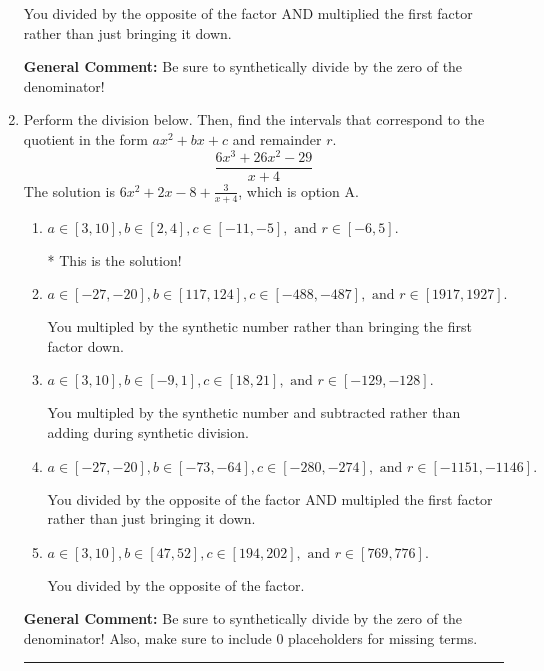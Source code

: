 \documentclass{extbook}[14pt]
\newcommand{\litem}[1]{\item #1

\rule{\textwidth}{0.4pt}}
\begin{document}
\begin{enumerate}
{\begin{enumerate}[label=\Alph*.]
 You divided by the opposite of the factor AND multiplied the first factor rather than just bringing it down.
\end{enumerate}

\textbf{General Comment:} Be sure to synthetically divide by the zero of the denominator!
}
\litem{
Perform the division below. Then, find the intervals that correspond to the quotient in the form $ax^2+bx+c$ and remainder $r$.
\[ \frac{6x^{3} +26 x^{2} -29}{x + 4} \]The solution is \( 6x^{2} +2 x -8 + \frac{3}{x + 4} \), which is option A.\begin{enumerate}[label=\Alph*.]
\item \( a \in [3, 10], b \in [2, 4], c \in [-11, -5], \text{ and } r \in [-6, 5]. \)

* This is the solution!
\item \( a \in [-27, -20], b \in [117, 124], c \in [-488, -487], \text{ and } r \in [1917, 1927]. \)

 You multipled by the synthetic number rather than bringing the first factor down.
\item \( a \in [3, 10], b \in [-9, 1], c \in [18, 21], \text{ and } r \in [-129, -128]. \)

 You multipled by the synthetic number and subtracted rather than adding during synthetic division.
\item \( a \in [-27, -20], b \in [-73, -64], c \in [-280, -274], \text{ and } r \in [-1151, -1146]. \)

 You divided by the opposite of the factor AND multipled the first factor rather than just bringing it down.
\item \( a \in [3, 10], b \in [47, 52], c \in [194, 202], \text{ and } r \in [769, 776]. \)

 You divided by the opposite of the factor.
\end{enumerate}

\textbf{General Comment:} Be sure to synthetically divide by the zero of the denominator! Also, make sure to include 0 placeholders for missing terms.
}
\end{enumerate}
\end{document}
